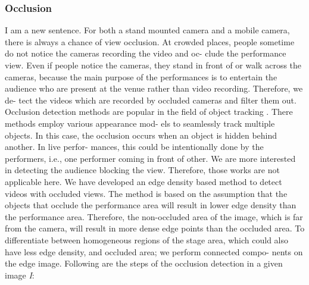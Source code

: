 \documentclass{sig-alternate}
\begin{document}
\subsubsection{Occlusion}
I am a new sentence.
For both a stand mounted camera and a mobile camera, there
is always a chance of view occlusion. At crowded places, people
sometime do not notice the cameras recording the video and oc-
clude the performance view. Even if people notice the cameras,
they stand in front of or walk across the cameras, because the main
purpose of the performances is to entertain the audience who are
present at the venue rather than video recording. Therefore, we de-
tect the videos which are recorded by occluded cameras and filter
them out.
Occlusion detection methods are popular in the field of object
tracking \cite{salas:thirteen}\cite{salas:nineteen}. There methods employ various appearance mod-
els to seamlessly track multiple objects. In this case, the occlusion
occurs when an object is hidden behind another. In live perfor-
mances, this could be intentionally done by the performers, i.e.,
one performer coming in front of other. We are more interested in
detecting the audience blocking the view. Therefore, those works
are not applicable here.
We have developed an edge density based method to detect videos
with occluded views. The method is based on the assumption that
the objects that occlude the performance area will result in lower
edge density than the performance area. Therefore, the non-occluded
area of the image, which is far from the camera, will result in more
dense edge points than the occluded area. To differentiate between
homogeneous regions of the stage area, which could also have less
edge density, and occluded area; we perform connected compo-
nents on the edge image. Following are the steps of the occlusion
detection in a given image \textit{I}:
\end{document}

